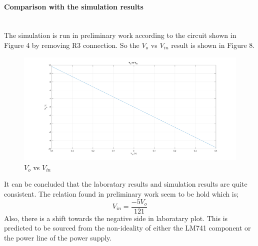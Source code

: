\documentclass[letterpaper,12pt]{article}
\begin{document}
\paragraph{Comparison with the simulation results}
 \mbox{}
\\
The simulation is run in preliminary work according to the circuit shown in Figure 4 by removing R3 connection. So the \(V_{o}\) vs \(V_{in}\) result is shown in Figure 8.
\begin{figure}[H]
	\centering
   \includegraphics[width=1\textwidth]{Pre_1b.png}
   \caption{\(V_{o}\) vs \(V_{in}\)}
\end{figure}
It can be concluded that the laboratary results and simulation results are quite consistent. The relation found in preliminary work seem to be hold which is;
\[V_{in} = \frac{-5 V_o}{121} \]
Also, there is a shift towards the negative side in laboratary plot. This is predicted to be sourced from the non-ideality of either the LM741 component or the power line of the power supply.
\end{document}
